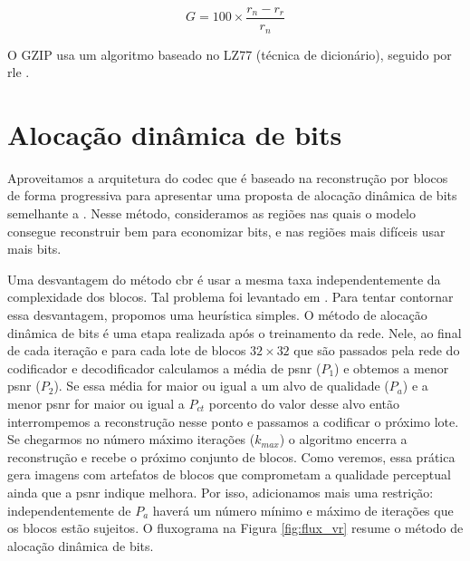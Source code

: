 \begin{equation}
\label{eq:gain_ce}
G = 100 \times \frac{r_n-r_r}{r_n}
\end{equation}


O GZIP usa um algoritmo baseado no LZ77 (técnica de dicionário), seguido por \acrshort{rle} \cite{sayood2017introduction}. 


\section{Alocação dinâmica de bits}\label{sec:adb}

Aproveitamos a arquitetura do \acrshort{codec} que é baseado na reconstrução por blocos de forma progressiva para apresentar uma proposta de alocação dinâmica de bits semelhante a \cite{Priming2017Johnston}. Nesse método, consideramos as regiões nas quais o modelo consegue reconstruir bem para economizar bits, e nas regiões  mais difíceis usar mais bits. 

Uma desvantagem do método \acrshort{cbr} é usar a mesma taxa independentemente da complexidade dos blocos. Tal problema foi levantado em \cite{Priming2017Johnston}. Para tentar contornar essa desvantagem, propomos uma heurística simples.
O método de alocação dinâmica de bits é uma etapa realizada após o treinamento da rede. Nele, ao final de cada iteração e para cada lote de blocos $32 \times 32$ que são passados pela rede do codificador e decodificador calculamos a média de \acrshort{psnr} ($P_1$) e obtemos a menor \acrshort{psnr} ($P_2$). Se essa média for maior ou igual a um alvo de qualidade ($P_{a}$) e a menor \acrshort{psnr} for maior ou igual a $P_{ct}$ porcento do valor desse alvo então interrompemos a reconstrução nesse ponto e passamos a codificar o próximo lote. Se chegarmos no número máximo iterações ($k_{max}$) o algoritmo encerra a reconstrução e recebe o próximo conjunto de blocos.
Como veremos, essa prática gera imagens com artefatos de blocos  que comprometam a qualidade perceptual ainda que a \acrshort{psnr} indique melhora. Por isso, adicionamos mais uma restrição: independentemente de $P_{a}$ haverá um número mínimo e máximo de iterações que os blocos estão sujeitos. O fluxograma na Figura \ref{fig:flux_vr} resume o método de alocação dinâmica de bits. 



